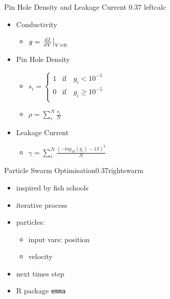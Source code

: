 \documentclass[hyperref={pdfpagelabels=false}, aspectratio=43, t]{beamer}  %
\begin{document}
\begin{graphicsFrame}
	{Pin Hole Density and Leakage Current}
	{}{0.37}
	{left}{calc}{}
	\vspace{2em}
	\begin{itemize}
		\item Conductivity
			\begin{itemize}
				\item $
					g = \eval{\dv{I}{V}}_{V =0}
					$
			\end{itemize}
	\vspace{0.5em}
		\item Pin Hole Density 
			\begin{itemize}
				\item $
	s_i = \begin{cases}
		1 &\text{if} \quad g_i < 10^{-5} \\
		0 &\text{if} \quad g_i \geq 10^{-5} \\
	\end{cases}
					$
				\item $
	\rho = \sum_i^N \frac{s_i}{N}
					$
			\end{itemize}
	\vspace{0.5em}
		\item Leakage Current 
			\begin{itemize}
				\item $
    \gamma = \sum_i^N \frac{ (-log_{10}(g_i) - 13)^2}{N}
	$
			\end{itemize}
	\end{itemize}
\end{graphicsFrame}
\begin{graphicsFrame}{Particle Swarm Optimisation}{}{0.37}{right}{swarm}{}
	\vspace{3em}
	\begin{itemize}
		\item inspired by fish schools %
		\item iterative process %
		\item particles: 
			\begin{itemize}
				\item input vars: position 
				\item velocity
			\end{itemize}
		\item next times step
		\item R package \texttt{emma} 
	\end{itemize}
\end{graphicsFrame}
\end{document}
